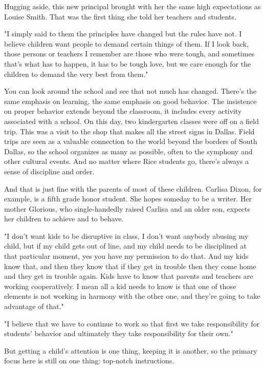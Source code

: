 Hugging aside, this new principal brought with her the same high expectations as Louise Smith. That was the first thing she told her teachers and students.

"I simply said to them the principles have changed but the rules have not. I believe children want people to demand certain things of them. If I look back, those persons or teachers I remember are those who were tough, and sometimes that's what has to happen, it has to be tough love, but we care enough for the children to demand the very best from them."

You can look around the school and see that not much has changed. There's the same emphasis on learning, the same emphasis on good behavior. The insistence on proper behavior extends beyond the classroom, it includes every activity associated with a school. On this day, two kindergarten classes were off on a field trip. This was a visit to the shop that makes all the street signs in Dallas. Field trips are seen as a valuable connection to the world beyond the borders of South Dallas, so the school organizes as many as possible, often to the symphony and other cultural events. And no matter where Rice students go, there's always a sense of discipline and order.

And that is just fine with the parents of most of these children. Carlisa Dixon, for example, is a fifth grade honor student. She hopes someday to be a writer. Her mother Glorious, who single-handedly raised Carlisa and an older son, expects her children to achieve and to behave.

"I don't want kids to be disruptive in class, I don't want anybody abusing my child, but if my child gets out of line, and my child needs to be disciplined at that particular moment, yes you have my permission to do that. And my kids know that, and then they know that if they get in trouble then they come home and they get in trouble again. Kids have to know that parents and teachers are working cooperatively. I mean all a kid needs to know is that one of those elements is not working in harmony with the other one, and they're going to take advantage of that."

"I believe that we have to continue to work so that first we take responsibility for students' behavior and ultimately they take responsibility for their own."

But getting a child's attention is one thing, keeping it is another, so the primary focus here is still on one thing: top-notch instructions.

